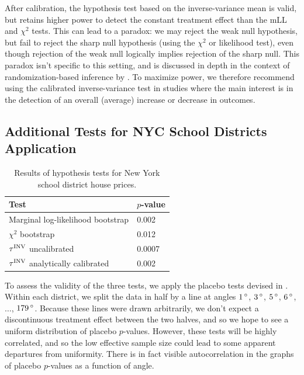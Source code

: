 	After calibration, the hypothesis test based on the inverse-variance mean is valid, but retains higher power to detect the constant treatment effect than the mLL and \(\chi^2\) tests.
This can lead to a paradox: we may reject the weak null hypothesis, but fail to reject the sharp null hypothesis (using the \(\chi^2\) or likelihood test), even though rejection of the weak null logically implies rejection of the sharp null.
This paradox isn't specific to this setting, and is discussed in depth in the context of randomization-based inference by \cite{Ding:2014sf}.
To maximize power, we therefore recommend using the calibrated inverse-variance test in studies where the main interest is in the detection of an overall (average) increase or decrease in outcomes.

\subsection{Additional Tests for NYC School Districts Application}
\label{sec:nyc_hypothesis_tests}

\begin{table}[tbp]
    \centering
    \bgroup
    \def\arraystretch{1.1}%
    \begin{tabular}{ll}
        \hline
        Test                   & \(p\)-value \\
        \hline
        Marginal log-likelihood bootstrap & 0.002     \\
        \(\chi^2\) bootstrap     & 0.012     \\
        \(\tau^{\mathrm{INV}}\) uncalibrated & 0.0007    \\
        \(\tau^{\mathrm{INV}}\) analytically calibrated   & 0.002 \\
        \hline
    \end{tabular}
    \egroup
    \caption{
		Results of hypothesis tests for New York school district house prices.
    	\label{table:NYC_tests}
	}
\end{table}

	To assess the validity of the three tests, we apply the placebo tests devised in .
Within each district, we split the data in half by a line at angles \(1{\,^\circ}\), \(3{\,^\circ}\), \(5{\,^\circ}\), \(6{\,^\circ}\), \(\dotsc\), \(179{\,^\circ}\).
Because these lines were drawn arbitrarily, we don't expect a discontinuous treatment effect between the two halves, and so we hope to see a uniform distribution of placebo \(p\)-values.
However, these tests will be highly correlated,
and so the low effective sample size could lead to some apparent departures from uniformity.
There is in fact visible autocorrelation in the graphs of placebo \(p\)-values as a function of angle.

